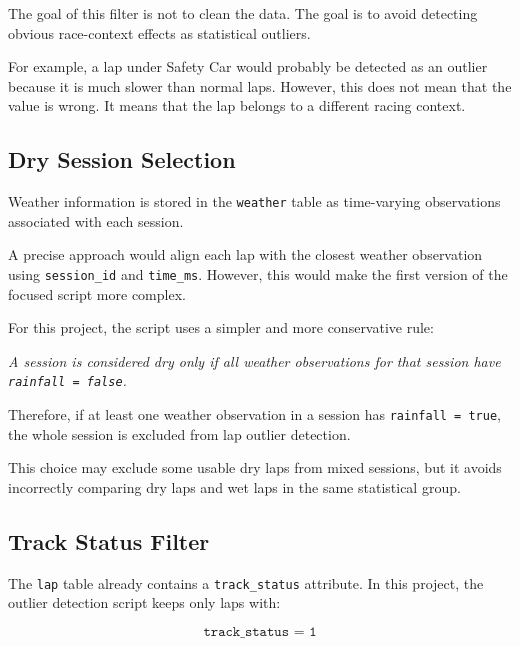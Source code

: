 \documentclass[a4paper,11pt]{article}
\begin{document}
	The goal of this filter is not to clean the data.
	The goal is to avoid detecting obvious race-context effects as statistical outliers.
	
	For example, a lap under Safety Car would probably be detected as an outlier because
	it is much slower than normal laps. However, this does not mean that the value is
	wrong. It means that the lap belongs to a different racing context.
	
	\subsection{Dry Session Selection}
	
	Weather information is stored in the \texttt{weather} table as time-varying
	observations associated with each session.
	
	A precise approach would align each lap with the closest weather observation using
	\texttt{session\_id} and \texttt{time\_ms}. However, this would make the first
	version of the focused script more complex.
	
	For this project, the script uses a simpler and more conservative rule:
	
	\begin{center}
		\textit{A session is considered dry only if all weather observations for that
			session have \texttt{rainfall = false}.}
	\end{center}
	
	Therefore, if at least one weather observation in a session has
	\texttt{rainfall = true}, the whole session is excluded from lap outlier detection.
	
	This choice may exclude some usable dry laps from mixed sessions, but it avoids
	incorrectly comparing dry laps and wet laps in the same statistical group.
	
	\subsection{Track Status Filter}
	
	The \texttt{lap} table already contains a \texttt{track\_status} attribute.
	In this project, the outlier detection script keeps only laps with:
	
	\[
	\texttt{track\_status = 1}
	\]
	
\end{document}
